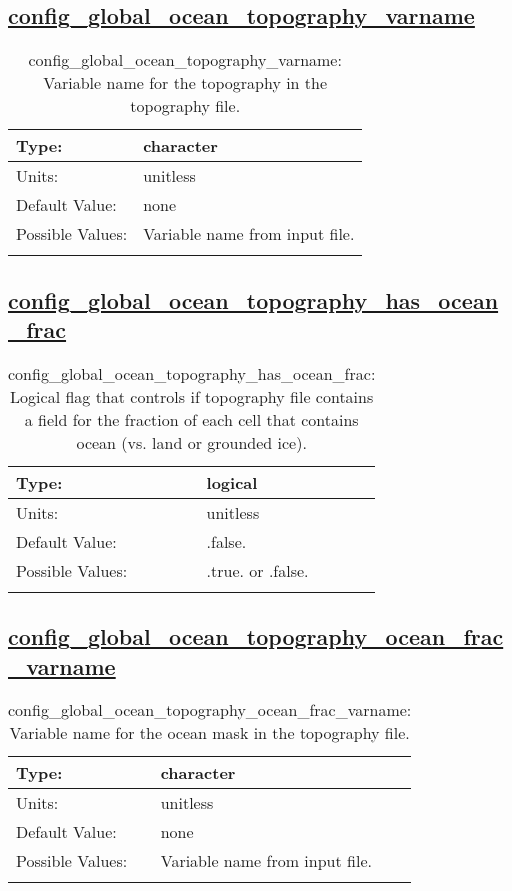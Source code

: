 \subsection[config\_global\_ocean\_topography\_varname]{\hyperref[sec:nm_tab_global_ocean]{config\_global\_ocean\_topography\_varname}}
\label{subsec:nm_sec_config_global_ocean_topography_varname}
\begin{center}
\begin{longtable}{| p{2.0in} || p{4.0in} |}
    \hline
    Type: & character \\
    \hline
    Units: & \si{unitless} \\
    \hline
    Default Value: & none \\
    \hline
    Possible Values: & Variable name from input file. \\
    \hline
    \caption{config\_global\_ocean\_topography\_varname: Variable name for the topography in the topography file.}
\end{longtable}
\end{center}
\subsection[config\_global\_ocean\_topography\_has\_ocean\_frac]{\hyperref[sec:nm_tab_global_ocean]{config\_global\_ocean\_topography\_has\_ocean\_frac}}
\label{subsec:nm_sec_config_global_ocean_topography_has_ocean_frac}
\begin{center}
\begin{longtable}{| p{2.0in} || p{4.0in} |}
    \hline
    Type: & logical \\
    \hline
    Units: & \si{unitless} \\
    \hline
    Default Value: & .false. \\
    \hline
    Possible Values: & .true. or .false. \\
    \hline
    \caption{config\_global\_ocean\_topography\_has\_ocean\_frac: Logical flag that controls if topography file contains a field for the fraction of each cell that contains ocean (vs. land or grounded ice).}
\end{longtable}
\end{center}
\subsection[config\_global\_ocean\_topography\_ocean\_frac\_varname]{\hyperref[sec:nm_tab_global_ocean]{config\_global\_ocean\_topography\_ocean\_frac\_varname}}
\label{subsec:nm_sec_config_global_ocean_topography_ocean_frac_varname}
\begin{center}
\begin{longtable}{| p{2.0in} || p{4.0in} |}
    \hline
    Type: & character \\
    \hline
    Units: & \si{unitless} \\
    \hline
    Default Value: & none \\
    \hline
    Possible Values: & Variable name from input file. \\
    \hline
    \caption{config\_global\_ocean\_topography\_ocean\_frac\_varname: Variable name for the ocean mask in the topography file.}
\end{longtable}
\end{center}
